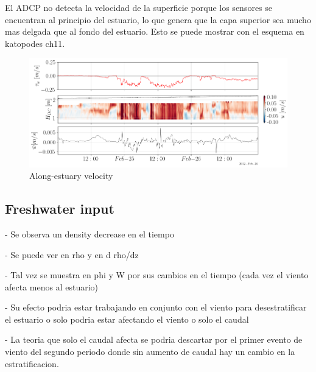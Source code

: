 \documentclass[tesis.tex]{subfiles}
\begin{document}
El ADCP no detecta la velocidad de la superficie porque los sensores se encuentran al principio del estuario, lo que genera que la capa superior sea mucho mas delgada que al fondo del estuario.
Esto se puede mostrar con el esquema en katopodes ch11.




\begin{figure}[h!]
    \centering
    \includegraphics[width=\textwidth]{Imagenes/vel_wind.png}
    \caption{Along-estuary velocity }
    \label{fig:velwind}
\end{figure}

\subsection{Freshwater input}

- Se observa un density decrease en el tiempo

- Se puede ver en rho y en d rho/dz 

- Tal vez se muestra en phi y W por sus cambios en el tiempo (cada vez el viento afecta menos al estuario)

- Su efecto podria estar trabajando en conjunto con el viento para desestratificar el estuario o solo podria estar afectando el viento o solo el caudal

- La teoria que solo el caudal afecta se podria descartar por el primer evento de viento del segundo periodo donde sin aumento de caudal hay un cambio en la estratificacion.
\end{document}
